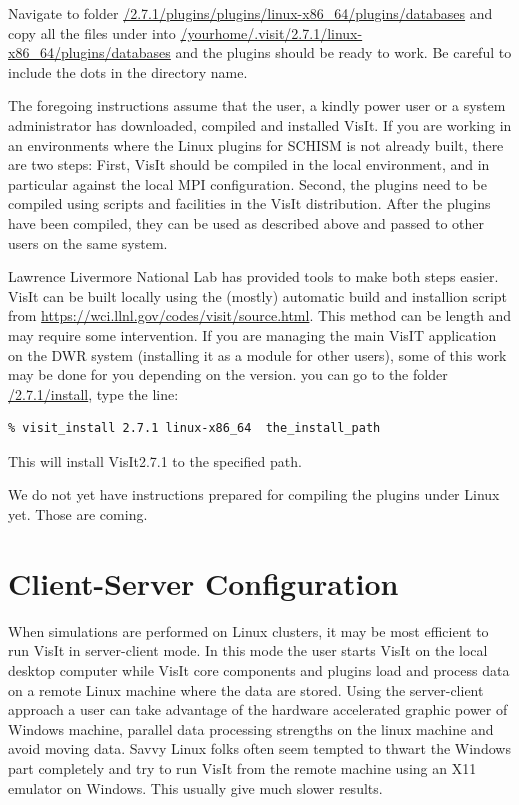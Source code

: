 \documentclass[12pt]{report}
\begin{document}
Navigate to folder \url{/2.7.1/plugins/plugins/linux-x86\_64/plugins/databases} 
and copy all the files under into \url{/yourhome/.visit/2.7.1/linux-x86\_64/plugins/databases} 
and the plugins should be ready to work. Be careful to include the dots in the directory name.

The foregoing instructions assume that the user, a kindly power user 
or a system administrator has downloaded, compiled and installed VisIt.
If you are working in an environments where the Linux plugins for SCHISM is not already built, 
there are two steps: First, VisIt should be compiled in the local environment, and in particular
against the local MPI configuration. Second, the plugins need to be compiled using scripts and facilities in the VisIt distribution. 
After the plugins have been compiled, they can be used as described above and passed to other users on the same system.
 
Lawrence Livermore National Lab has provided tools to make both steps easier. VisIt can be built locally 
using the (mostly) automatic build and installion script from \url{https://wci.llnl.gov/codes/visit/source.html}. 
This method can be length and may require some intervention.      
If you are managing the main VisIT application on the DWR system (installing it as a module for other users), 
some of this work may be done for you depending on the version.
you can go to the folder \url{/2.7.1/install}, type the line:
\begin{verbatim}
% visit_install 2.7.1 linux-x86_64  the_install_path
\end{verbatim} 
This will install VisIt2.7.1  to the specified path. 

We do not yet have instructions prepared for compiling the plugins under Linux yet. Those are coming.

\section{Client-Server Configuration}
\label{chap:client}
When simulations are performed on Linux clusters, it may be most efficient to run VisIt in server-client mode. 
In this mode the user starts VisIt on the local desktop computer while VisIt core components and plugins load 
and process data on a remote Linux machine where the  data are stored. Using the server-client approach a user can 
take advantage of the hardware accelerated graphic power of Windows machine, parallel data processing strengths 
on the linux machine and avoid moving data. Savvy Linux folks often seem tempted to thwart the Windows part 
completely and try to run VisIt from the remote machine using an X11 emulator on Windows. This usually give much slower results.
\end{document}

